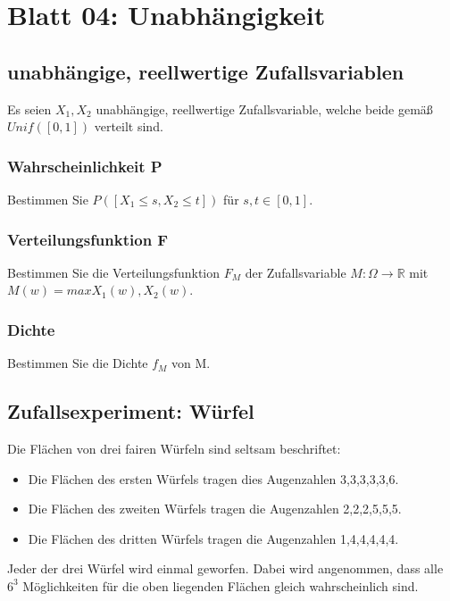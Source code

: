 \documentclass[paper=a4, fontsize=11pt]{scrartcl}
\numberwithin{equation}{section}
\numberwithin{figure}{section}
\numberwithin{table}{section}
\begin{document}
\section{Blatt 04: Unabhängigkeit}
\subsection{unabhängige, reellwertige Zufallsvariablen}
Es seien $X_{1}, X_{2}$ unabhängige, reellwertige Zufallsvariable, welche beide gemäß $Unif([0,1])$ verteilt sind. \\

\subsubsection{Wahrscheinlichkeit P}
Bestimmen Sie $P([X_{1} \leq s, X_{2} \leq t])$ für $s,t \in [0,1]$. \\

\subsubsection{Verteilungsfunktion F}
Bestimmen Sie die Verteilungsfunktion $F_{M}$ der Zufallsvariable $M: \Omega \rightarrow \mathbb{R}$ mit $M(w)=max{X_{1}(w),X_{2}(w)}$. \\

\subsubsection{Dichte}
Bestimmen Sie die Dichte $f_{M}$ von M. \\

\subsection{Zufallsexperiment: Würfel}
Die Flächen von drei fairen Würfeln sind seltsam beschriftet:
\begin{itemize}
\item Die Flächen des ersten Würfels tragen dies Augenzahlen 3,3,3,3,3,6.
\item Die Flächen des zweiten Würfels tragen die Augenzahlen 2,2,2,5,5,5.
\item Die Flächen des dritten Würfels tragen die Augenzahlen 1,4,4,4,4,4.
\end{itemize}

Jeder der drei Würfel wird einmal geworfen. Dabei wird angenommen, dass alle $6^{3}$ Möglichkeiten für die oben liegenden Flächen gleich wahrscheinlich sind. \\
\end{document}
